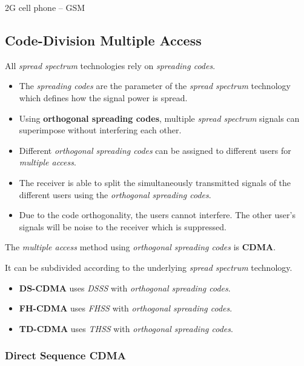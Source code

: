 \begin{refsection}
\begin{example}{2G cell phone -- \ac{GSM}}
\end{example}

\subsection{Code-Division Multiple Access}

All \emph{spread spectrum} technologies rely on \emph{spreading codes}.
\begin{itemize}
	\item The \emph{spreading codes} are the parameter of the \emph{spread spectrum} technology which defines how the signal power is spread.
	\item Using  \textbf{orthogonal spreading codes}, multiple \emph{spread spectrum} signals can superimpose without interfering each other.
	\item Different \emph{orthogonal spreading codes} can be assigned to different users for \emph{multiple access}.
	\item The receiver is able to split the simultaneously transmitted signals of the different users using the \emph{orthogonal spreading codes}.
	\item Due to the code orthogonality, the users cannot interfere. The other user's signals will be noise to the receiver which is suppressed.
\end{itemize}

The \emph{multiple access} method using \emph{orthogonal spreading codes} is  \textbf{\acf{CDMA}}.

It can be subdivided according to the underlying \emph{spread spectrum} technology.
\begin{itemize}
	\item \textbf{\acf{DS-CDMA}} uses \emph{\acf{DSSS}} with \emph{orthogonal spreading codes}.
	\item \textbf{\acf{FH-CDMA}} uses \emph{\acf{FHSS}} with \emph{orthogonal spreading codes}.
	\item \textbf{\acf{TD-CDMA}} uses \emph{\acf{THSS}} with \emph{orthogonal spreading codes}.
\end{itemize}

\subsubsection{Direct Sequence CDMA}


\end{refsection}
